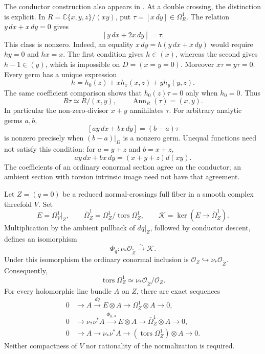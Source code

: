 \documentclass[11pt]{article}
\numberwithin{equation}{section}
\begin{document}
The conductor construction also appears in
\cite[\S10, Lemma~10.3]{TorusConstruction}.
At a double crossing, the distinction is explicit. In
$R=\mathbb C\{x,y,z\}/(xy)$, put
$\tau=[x\,dy]\in\Omega_R^1$. The relation
$y\,dx+x\,dy=0$ gives
\[
 [y\,dx+2x\,dy]=\tau.
\]
This class is nonzero. Indeed, an equality
$x\,dy=h(y\,dx+x\,dy)$ would require $hy=0$ and $hx=x$.
The first condition gives $h\in(x)$, whereas the second gives
$h-1\in(y)$, which is impossible on $D=(x=y=0)$.
Moreover $x\tau=y\tau=0$. Every germ has a unique expression
\[
 h=h_0(z)+xh_x(x,z)+yh_y(y,z).
\]
The same coefficient comparison shows that $h_0(z)\tau=0$
only when $h_0=0$. Thus
\begin{equation}\label{ad:eq:node-torsion}
 R\tau\simeq R/(x,y),\qquad
 \operatorname{Ann}_R(\tau)=(x,y).
\end{equation}
In particular the non-zero-divisor $x+y$ annihilates $\tau$.
For arbitrary analytic germs $a,b$,
\[
 [a y\,dx+b x\,dy]=(b-a)\tau
\]
is nonzero precisely when $(b-a)|_D$ is a nonzero germ.
Unequal functions need not satisfy this condition: for
$a=y+z$ and $b=x+z$,
\[
 a y\,dx+b x\,dy=(x+y+z)d(xy).
\]
The coefficients of an ordinary conormal section agree on the
conductor; an ambient section with torsion intrinsic image need
not have that agreement.

\begin{theorem}\label{ad:thm:ambient-kernel}
Let $Z=(q=0)$ be a reduced normal-crossings full fiber in a smooth
complex threefold $V$. Set
\[
 E=\Omega_V^1|_Z,\qquad
 \overline\Omega_Z^1=\Omega_Z^1/\operatorname{tors}\Omega_Z^1,
 \qquad \mathcal K=\ker(E\longrightarrow\overline\Omega_Z^1).
\]
Multiplication by the ambient pullback of $dq|_Z$, followed by
conductor descent, defines an isomorphism
\begin{equation}\label{ad:eq:ambient-kernel}
 \Phi_q:\nu_*\mathcal O_{\widetilde Z}\xrightarrow{\sim}\mathcal K.
\end{equation}
Under this isomorphism the ordinary conormal inclusion is
$\mathcal O_Z\hookrightarrow\nu_*\mathcal O_{\widetilde Z}$.
Consequently,
\[
 \operatorname{tors}\Omega_Z^1
 \simeq\nu_*\mathcal O_{\widetilde Z}/\mathcal O_Z.
\]
For every holomorphic line bundle $A$ on $Z$, there are exact
sequences
\begin{align}
 0&\longrightarrow A\xrightarrow{dq}E\otimes A
       \longrightarrow\Omega_Z^1\otimes A\longrightarrow0,
       \label{ad:eq:conormal-twist}\\
 0&\longrightarrow\nu_*\nu^*A\xrightarrow{\Phi_{q,A}}E\otimes A
       \longrightarrow\overline\Omega_Z^1\otimes A
       \longrightarrow0,\label{ad:eq:kernel-twist}\\
 0&\longrightarrow A\longrightarrow\nu_*\nu^*A
       \longrightarrow(\operatorname{tors}\Omega_Z^1)\otimes A
       \longrightarrow0.\label{ad:eq:torsion-twist}
\end{align}
Neither compactness of $V$ nor rationality of the normalization
is required.
\end{theorem}
\end{document}
